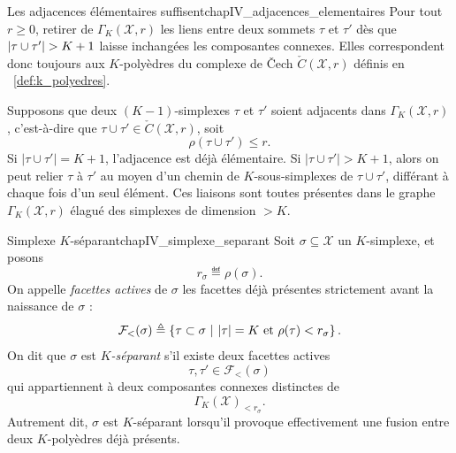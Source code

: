 
\begin{Fait}{Les adjacences élémentaires suffisent}{chapIV_adjacences_elementaires}
Pour tout $r\ge0$, retirer de $\Gamma_K(\mathcal X,r)$ les liens entre deux sommets  $\tau$ et $\tau'$ dès que $\lvert \tau \cup \tau' \rvert > K+1$ laisse inchangées les composantes connexes. Elles correspondent donc toujours aux $K$-polyèdres du complexe de \v Cech $\check C(\mathcal X,r)$ définis en \Def~\ref{def:k_polyedres}.
\end{Fait}

\begin{Preuve}
Supposons que deux $(K-1)$-simplexes $\tau$ et $\tau'$ soient adjacents dans $\Gamma_K(\mathcal X,r)$, c'est-à-dire que $\tau \cup \tau' \in\check C(\mathcal X,r)$, soit
\[
    \rho(\tau\cup\tau') \le r .
\]
Si $|\tau \cup \tau'|=K+1$, l'adjacence est déjà élémentaire. Si $|\tau \cup \tau'|>K+1$, alors on peut relier $\tau$ à $\tau'$ au moyen d'un chemin de $K$-sous-simplexes de $\tau \cup \tau'$, différant à chaque fois d'un seul élément. Ces liaisons sont toutes présentes dans le graphe $\Gamma_K(\mathcal X,r)$ élagué des simplexes de dimension $>K$.
\end{Preuve}


\begin{Definition}{Simplexe $K$-séparant}{chapIV_simplexe_separant}
Soit $\sigma\subseteq\mathcal X$ un $K$-simplexe, et posons
\[
    r_\sigma \eqdef \rho(\sigma).
\]
On appelle \emph{facettes actives} de $\sigma$ les facettes déjà présentes strictement avant la naissance de $\sigma$ :
\[
    \mathcal F_{<}(\sigma)
    \triangleq
    \left\{
        \tau\subset\sigma
        \ \middle|\
        \lvert \tau \rvert=K
        \ \text{et}\
        \rho(\tau)<r_\sigma
    \right\}.
\]
On dit que $\sigma$ est \emph{$K$-séparant} s'il existe deux facettes actives
\[
    \tau,\tau'\in\mathcal F_{<}(\sigma)
\]
qui appartiennent à deux composantes connexes distinctes de
\[
    \Gamma_K(\mathcal X)_{<r_\sigma}.
\]
Autrement dit, $\sigma$ est $K$-séparant lorsqu'il provoque effectivement une fusion entre deux $K$-polyèdres déjà présents.
\end{Definition}


